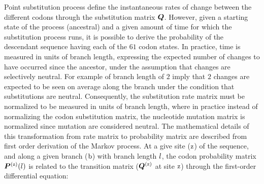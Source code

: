 Point substitution process define the instantaneous rates of change between the different codons through the substitution matrix $\bm{Q}$.
However, given a starting state of the process (ancestral) and a given amount of time for which the substitution process runs, it is possible to derive the probability of the descendant sequence having each of the $61$ codon states.
In practice, time is measured in units of branch length, expressing the expected number of changes to have occurred since the ancestor, under the assumption that changes are selectively neutral.
For example of branch length of $2$ imply that $2$ changes are expected to be seen on average along the branch under the condition that substitutions are neutral.
Consequently, the substitution rate matrix must be normalized to be measured in units of branch length, where in practice instead of normalizing the codon substitution matrix, the nucleotide mutation matrix is normalized since mutation are considered neutral.
The mathematical details of this transformation from rate matrix to probability matrix are described from first order derivation of the Markov process.
At a give site ($\text{z}$) of the sequence, and along a given branch ($\text{b}$) with branch length $l$, the codon probability matrix $\bm{P}^{(\text{z})}(l)$ is related to the transition matrix ($\bm{Q}^{(\text{z})}$ at site $\text{z}$) through the first-order differential equation:

